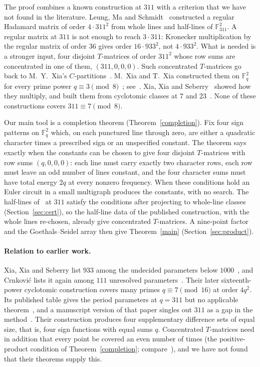 \documentclass[11pt]{article}
\theoremstyle{remark}
\newcommand{\F}{\mathbb F}
\begin{document}
The proof combines a known construction at $311$ with a criterion that we have not found in the literature. Leung, Ma and Schmidt~\cite{LMS} constructed a regular Hadamard matrix of order $4\cdot311^2$ from whole lines and half-lines of $\F_{311}^2$. A regular matrix at $311$ is not enough to reach $3\cdot311$: Kronecker multiplication by the regular matrix of order $36$ gives order $16\cdot933^2$, not $4\cdot933^2$. What is needed is a stronger input, four disjoint $T$-matrices of order $311^2$ whose row sums are concentrated in one of them, $(311,0,0,0)$. Such concentrated $T$-matrices go back to M.~Y.~Xia's $C$-partitions~\cite{Xia84}. M.~Xia and T.~Xia constructed them on $\F_q^2$ for every prime power $q\equiv3\pmod8$~\cite{XX99}; see~\cite[Proposition~4]{XXS}. Xia, Xia and Seberry~\cite{XXS} showed how they multiply, and built them from cyclotomic classes at $7$ and $23$~\cite[Lemma~8 and the proof of Proposition~8]{XXS}. None of these constructions covers $311\equiv7\pmod8$.

Our main tool is a completion theorem (Theorem~\ref{completion}). Fix four sign patterns on $\F_q^2$ which, on each punctured line through zero, are either a quadratic character times a prescribed sign or an unspecified constant. The theorem says exactly when the constants can be chosen to give four disjoint $T$-matrices with row sums $(q,0,0,0)$: each line must carry exactly two character rows, each row must leave an odd number of lines constant, and the four character sums must have total energy $2q$ at every nonzero frequency. When these conditions hold an Euler circuit in a small multigraph produces the constants, with no search. The half-lines of~\cite{LMS} at $311$ satisfy the conditions after projecting to whole-line classes (Section~\ref{sec:cert}), so the half-line data of the published construction, with the whole lines re-chosen, already give concentrated $T$-matrices. A nine-point factor and the Goethals--Seidel array then give Theorem~\ref{main} (Section~\ref{sec:product}).

\paragraph{Relation to earlier work.}
Xia, Xia and Seberry list $933$ among the undecided parameters below $1000$~\cite[\S4.2]{XXS07}, and Crnkovi\'c lists it again among $111$ unresolved parameters~\cite{Crn}. Their later sixteenth-power cyclotomic construction covers many primes $q\equiv7\pmod{16}$ at order $4q^2$. Its published table gives the period parameters at $q=311$ but no applicable theorem~\cite[Appendix~A]{XXS21}, and a manuscript version of that paper singles out $311$ as a gap in the method~\cite[Remark~3]{XSXpre}. Their construction produces four supplementary difference sets of equal size, that is, four sign functions with equal sums $q$. Concentrated $T$-matrices need in addition that every point be covered an even number of times (the positive-product condition of Theorem~\ref{completion}; compare~\cite[Theorem~2]{XXS}), and we have not found that their theorems supply this.
\end{document}
